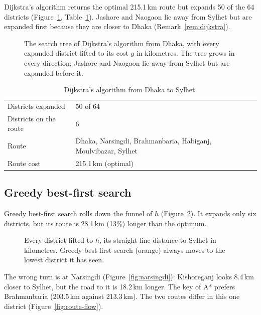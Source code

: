 Dijkstra's algorithm returns the optimal 215.1\,km route but expands 50 of the
64 districts (Figure~\ref{fig:dijkstra-tree}, Table~\ref{tab:dijkstra-result}).
Jashore and Naogaon lie away from Sylhet but are expanded first because they are
closer to Dhaka (Remark~\ref{rem:dijkstra}).

\begin{figure}[htbp]
  \centering
  
  \caption{The search tree of Dijkstra's algorithm from Dhaka, with every
    expanded district lifted to its cost $g$ in kilometres. The tree grows in
    every direction; Jashore and Naogaon lie away from Sylhet but are expanded
    before it.}\label{fig:dijkstra-tree}
\end{figure}

\begin{table}[htbp]
  \centering
  \caption{Dijkstra's algorithm from Dhaka to Sylhet.}\label{tab:dijkstra-result}
  \begin{tabular}{@{}ll@{}}
    \toprule
    Districts expanded & 50 of 64\\
    Districts on the route & 6\\
    Route & Dhaka, Narsingdi, Brahmanbaria, Habiganj, Moulvibazar, Sylhet\\
    Route cost & 215.1\,km (optimal)\\
    \bottomrule
  \end{tabular}
\end{table}

\subsection{Greedy best-first search}\label{sec:map-greedy}

Greedy best-first search rolls down the funnel of $h$
(Figure~\ref{fig:greedy-compass}). It expands only six districts, but its route
is 28.1\,km (13\%) longer than the optimum.

\begin{figure}[htbp]
  \centering
  
  \caption{Every district lifted to $h$, its straight-line distance to Sylhet in
    kilometres. Greedy best-first search (orange) always moves to the lowest
    district it has seen.}\label{fig:greedy-compass}
\end{figure}

The wrong turn is at Narsingdi (Figure~\ref{fig:narsingdi}): Kishoreganj looks
8.4\,km closer to Sylhet, but the road to it is 18.2\,km longer. The key of A*
prefers Brahmanbaria (203.5\,km against 213.3\,km). The two routes differ in
this one district (Figure~\ref{fig:route-flow}).

